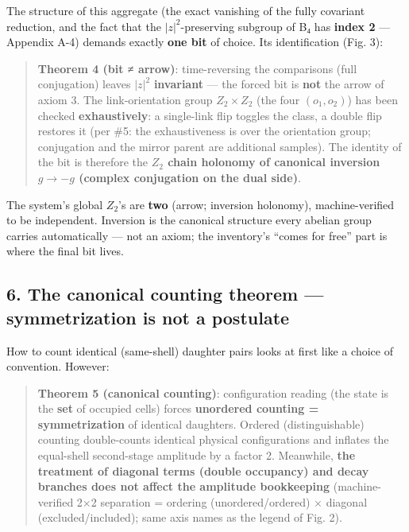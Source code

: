\documentclass[
]{article}
\begin{document}
The structure of this aggregate (the exact vanishing of the fully
covariant reduction, and the fact that the \(|z|^2\)-preserving subgroup
of B₄ has \textbf{index 2} --- Appendix A-4) demands exactly \textbf{one
bit} of choice. Its identification (Fig. 3):

\begin{quote}
\textbf{Theorem 4 (bit ≠ arrow)}: time-reversing the comparisons (full
conjugation) leaves \(|z|^2\) \textbf{invariant} --- the forced bit is
\textbf{not} the arrow of axiom 3. The link-orientation group
\(Z_2\times Z_2\) (the four \((o_1,o_2)\)) has been checked
\textbf{exhaustively}: a single-link flip toggles the class, a double
flip restores it (per \#5: the exhaustiveness is over the orientation
group; conjugation and the mirror parent are additional samples). The
identity of the bit is therefore the \textbf{\(Z_2\) chain holonomy of
canonical inversion \(g\to-g\) (complex conjugation on the dual side)}.
\end{quote}

The system's global \(Z_2\)'s are \textbf{two} (arrow; inversion
holonomy), machine-verified to be independent. Inversion is the
canonical structure every abelian group carries automatically --- not an
axiom; the inventory's ``comes for free'' part is where the final bit
lives.

\subsection{6. The canonical counting theorem --- symmetrization is not
a
postulate}\label{the-canonical-counting-theorem-symmetrization-is-not-a-postulate}

How to count identical (same-shell) daughter pairs looks at first like a
choice of convention. However:

\begin{quote}
\textbf{Theorem 5 (canonical counting)}: configuration reading (the
state is the \textbf{set} of occupied cells) forces \textbf{unordered
counting = symmetrization} of identical daughters. Ordered
(distinguishable) counting double-counts identical physical
configurations and inflates the equal-shell second-stage amplitude by a
factor 2. Meanwhile, \textbf{the treatment of diagonal terms (double
occupancy) and decay branches does not affect the amplitude bookkeeping}
(machine-verified 2×2 separation = ordering (unordered/ordered) ×
diagonal (excluded/included); same axis names as the legend of Fig. 2).
\end{quote}
\end{document}
